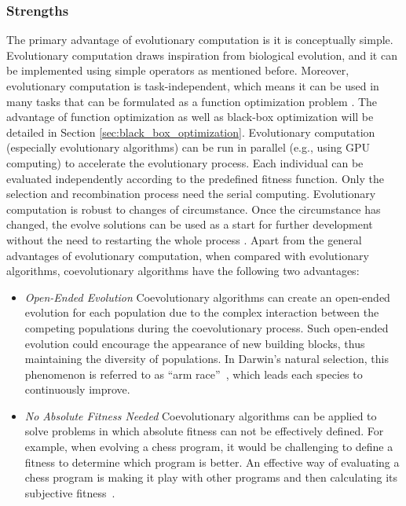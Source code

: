 \subsubsection{Strengths}

The primary advantage of evolutionary computation is it is conceptually simple. Evolutionary computation draws inspiration from biological evolution, and it can be implemented using simple operators as mentioned before. Moreover, evolutionary computation is task-independent, which means it can be used in many tasks that can be formulated as a function optimization problem \cite{Fogel:1997}. The advantage of function optimization as well as black-box optimization will be detailed in Section \ref{sec:black_box_optimization}. Evolutionary computation (especially evolutionary algorithms) can be run in parallel (e.g., using GPU computing) to accelerate the evolutionary process. Each individual can be evaluated independently according to the predefined fitness function. Only the selection and recombination process need the serial computing. Evolutionary computation is robust to changes of circumstance. Once the circumstance has changed, the evolve solutions can be used as a start for further development without the need to restarting the whole process \cite{Hornby2011}. Apart from the general advantages of evolutionary computation, when compared with evolutionary algorithms, coevolutionary algorithms have the following two advantages:

\begin{itemize}
\item \textit{Open-Ended Evolution} Coevolutionary algorithms can create an open-ended evolution for each population due to the complex interaction between the competing populations during the coevolutionary process. Such open-ended evolution could encourage the appearance of new building blocks, thus maintaining the diversity of populations. In Darwin's natural selection, this phenomenon is referred to as ``arm race''~\cite{Dawkins_1979}, which leads each species to continuously improve.  

\item \textit{No Absolute Fitness Needed} Coevolutionary algorithms can be applied to solve problems in which absolute fitness can not be effectively defined. For example, when evolving a chess program, it would be challenging to define a fitness to determine which program is better. An effective way of evaluating a chess program is making it play with other programs and then calculating its subjective fitness~\cite{Angeline_1993, David2014}. 
\end{itemize}

